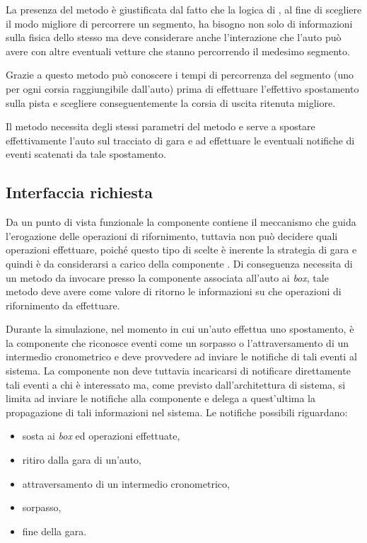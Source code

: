 La presenza del metodo  è giustificata dal fatto che la logica di \car{}, al fine di scegliere il modo migliore di percorrere un segmento, ha bisogno non solo di informazioni sulla fisica dello stesso ma deve considerare anche l'interazione che l'auto può avere con altre eventuali vetture che stanno percorrendo il medesimo segmento.

Grazie a questo metodo \car{} può conoscere i tempi di percorrenza del segmento (uno per ogni corsia raggiungibile dall'auto) prima di effettuare l'effettivo spostamento sulla pista e scegliere conseguentemente la corsia di uscita ritenuta migliore.

Il metodo  necessita degli stessi parametri del metodo  e serve a spostare effettivamente l'auto sul tracciato di gara e ad effettuare le eventuali notifiche di eventi scatenati da tale spostamento.

\subsection*{Interfaccia richiesta}
Da un punto di vista funzionale la componente \track{} contiene il meccanismo che guida l'erogazione delle operazioni di rifornimento, tuttavia non può decidere quali operazioni effettuare, poiché questo tipo di scelte è inerente la strategia di gara e quindi è da considerarsi a carico della componente \team{}. Di conseguenza \track{} necessita di un metodo  da invocare presso la componente \team{} associata all'auto ai \textit{box}, tale metodo deve avere come valore di ritorno le informazioni su che operazioni di rifornimento da effettuare.

Durante la simulazione, nel momento in cui un'auto effettua uno spostamento, è la componente \track{} che riconosce eventi come un sorpasso o l'attraversamento di un intermedio cronometrico e deve provvedere ad inviare le notifiche di tali eventi al sistema. La componente \track{} non deve tuttavia incaricarsi di notificare direttamente tali eventi a chi è interessato ma, come previsto dall'architettura di sistema, si limita ad inviare le notifiche alla componente \evdisp{} e delega a quest'ultima la propagazione di tali informazioni nel sistema.
Le notifiche possibili riguardano:
\begin{itemize}
\item sosta ai \textit{box} ed operazioni effettuate,
\item ritiro dalla gara di un'auto,
\item attraversamento di un intermedio cronometrico,
\item sorpasso,
\item fine della gara.
\end{itemize}

